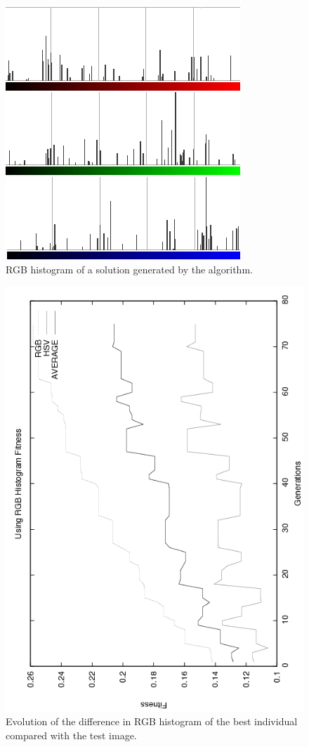 \begin{figure}
\centering
   \includegraphics[scale =0.6] {gfx/art/individuohist.png}
\caption{RGB histogram of a solution generated by the algorithm.}
\label{fig:histoind}
\end{figure}

\begin{figure}
   \includegraphics[angle=-90,scale =0.40] {gfx/art/rgbgens.png}
\caption{Evolution of the difference in RGB histogram of the best individual compared with the test image. }
\label{fig:rgbgens}
\end{figure}

